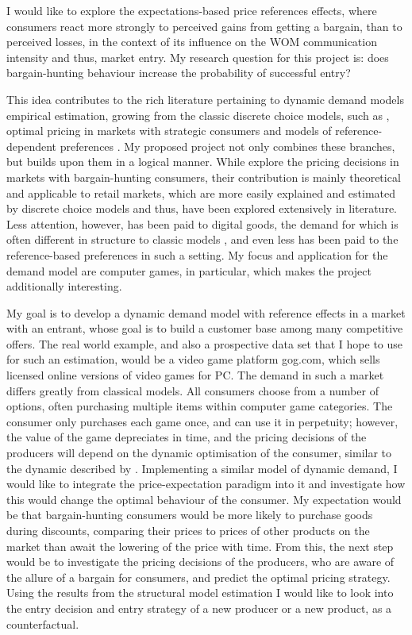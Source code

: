 \documentclass[13pt]{article}
\numberwithin{figure}{section}
\numberwithin{table}{section}
\theoremstyle{indented}
\numberwithin{equation}{section} %
\begin{document}
I would like to explore the expectations-based price references effects, where consumers react more strongly to perceived gains from getting a bargain, than to perceived losses, in the context of its influence on the WOM communication intensity and thus, market entry. My research question for this project is: does bargain-hunting behaviour increase the probability of successful entry? 

This idea contributes to the rich literature pertaining to dynamic demand models empirical estimation, growing from the classic discrete choice models, such as \citet{BLP}, optimal pricing in markets with strategic consumers \citet{Lobel2016} and models of reference-dependent preferences \citet{Gentry2018}. My proposed project not only combines these branches, but builds upon them in a logical manner. 
While \citet{Gentry2021} explore the pricing decisions in markets with bargain-hunting consumers, their contribution is mainly theoretical and applicable to retail markets, which are more easily explained and estimated by discrete choice models and thus, have been explored extensively in literature. Less attention, however, has been paid to digital goods, the demand for which is often different in structure to classic models \citet{penetration}, and even less has been paid to the reference-based preferences in such a setting. My focus and application for the demand model are computer games, in particular, which makes the project additionally interesting.

My goal is to develop a dynamic demand model with reference effects in a market with an entrant, whose goal is to build a customer base among many competitive offers. The real world example, and also a prospective data set that I hope to use for such an estimation, would be a video game platform gog.com, which sells licensed online versions of video games for PC. The demand in such a market differs greatly from classical models. All consumers choose from a number of options, often purchasing multiple items within computer game categories. The consumer only purchases each game once, and can use it in perpetuity; however, the value of the game depreciates in time, and the pricing decisions of the producers will depend on the dynamic optimisation of the consumer, similar to the dynamic described by \citet{Gowrisankaran2012}. Implementing a similar model of dynamic demand, I would like to integrate the price-expectation paradigm into it and investigate how this would change the optimal behaviour of the consumer. My expectation would be that bargain-hunting consumers would be more likely to purchase goods during discounts, comparing their prices to prices of other products on the market than await the lowering of the price with time. From this, the next step would be to investigate the pricing decisions of the producers, who are aware of the allure of a bargain for consumers, and predict the optimal pricing strategy. Using the results from the structural model estimation I would like to look into the entry decision and entry strategy of a new producer or a new product, as a counterfactual.
\end{document}
